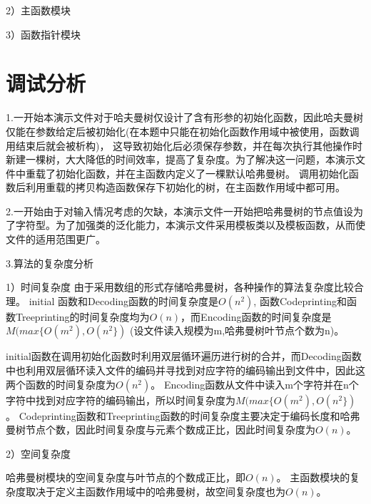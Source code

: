 \documentclass[paper=a4,UTF8,fontsize=11pt]{scrartcl} %
\numberwithin{equation}{section} %
\numberwithin{figure}{section} %
\numberwithin{table}{section} %
\begin{document}
2）主函数模块


3）函数指针模块

\vspace{0.3cm}
\section{调试分析}
1.一开始本演示文件对于哈夫曼树仅设计了含有形参的初始化函数，因此哈夫曼树仅能在参数给定后被初始化(在本题中只能在初始化函数作用域中被使用，函数调用结束后就会被析构)，
这导致初始化后必须保存参数，并在每次执行其他操作时新建一棵树，大大降低的时间效率，提高了复杂度。为了解决这一问题，本演示文件中重载了初始化函数，并在主函数内定义了一棵默认哈弗曼树。
调用初始化函数后利用重载的拷贝构造函数保存下初始化的树，在主函数作用域中都可用。

2.一开始由于对输入情况考虑的欠缺，本演示文件一开始把哈弗曼树的节点值设为了字符型。为了加强类的泛化能力，本演示文件采用模板类以及模板函数，从而使文件的适用范围更广。

3.算法的复杂度分析

1）时间复杂度
由于采用数组的形式存储哈弗曼树，各种操作的算法复杂度比较合理。
initial 函数和Decoding函数的时间复杂度是$O(n^{2})$, 函数Codeprinting和函数Treeprinting的时间复杂度均为$O(n)$，而Encoding函数的时间复杂度是$M(max\{O(m^{2}),O(n^{2}\})$
(设文件读入规模为m,哈弗曼树叶节点个数为n)。

initial函数在调用初始化函数时利用双层循环遍历进行树的合并，而Decoding函数中也利用双层循环读入文件的编码并寻找到对应字符的编码输出到文件中，因此这两个函数的时间复杂度为$O(n^{2})$。
Encoding函数从文件中读入m个字符并在n个字符中找到对应字符的编码输出，所以时间复杂度为$M(max\{O(m^{2}),O(n^{2}\})$。
Codeprinting函数和Treeprinting函数的时间复杂度主要决定于编码长度和哈弗曼树节点个数，因此时间复杂度与元素个数成正比，因此时间复杂度为$O(n)$。

2）空间复杂度

哈弗曼树模块的空间复杂度与叶节点的个数成正比，即$O(n)$。
主函数模块的复杂度取决于定义主函数作用域中的哈弗曼树，故空间复杂度也为$O(n)$。
\vspace{0.5cm}
\end{document}
